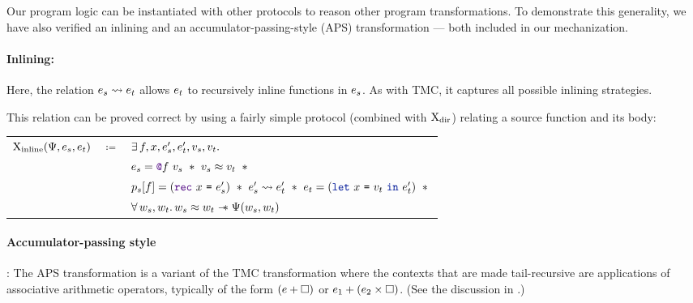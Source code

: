 Our program logic can be instantiated with other protocols to reason other program transformations.
To demonstrate this generality, we have also verified an inlining and an accumulator-passing-style (APS) transformation --- both included in our mechanization.

\paragraph{Inlining:} Here, the relation $\datalangExpr_s \rightsquigarrow \datalangExpr_t$ allows $\datalangExpr_t$ to recursively inline functions in $\datalangExpr_s$.
As with TMC, it captures all possible inlining strategies.

This relation can be proved correct by using a fairly simple protocol (combined with $\mathrm{X}_\mathrm{dir}$) relating a source function and its body:

\begin{tabular}{rcl}
        $\iProt_\mathrm{inline} (\iPredTwo, \datalangExpr_s, \datalangExpr_t)$
        & $\coloneqq$ &
        $\exists \datalangFn, \datalangVar, \datalangExpr_s', \datalangExpr_t', \datalangVal_s, \datalangVal_t \ldotp$
    \\
        &&
        $
        \datalangExpr_s = \datalangCall{\datalangFnptr{\datalangFn}}{\datalangVal_s}
        \ \iSep\ %
        \datalangVal_s \iSimilar \datalangVal_t
        \ \iSep {}$
    \\
        &&
        $\datalangProg_s [\datalangFn] = (\datalangRec{\datalangVar}{\datalangExpr_s'})
        \ \iSep\ %
        \datalangExpr_s' \rightsquigarrow \datalangExpr_t'
        \ \iSep\ %
        \datalangExpr_t = (\datalangLet{\datalangVar}{\datalangVal_t}{\datalangExpr_t'})
        \ \iSep {}$
    \\
        &&
        $\forall \datalangValTwo_s, \datalangValTwo_t \ldotp
        \datalangValTwo_s \iSimilar \datalangValTwo_t \iWand
        \iPredTwo (\datalangValTwo_s, \datalangValTwo_t)$
\end{tabular}
\medskip

\paragraph{Accumulator-passing style}: The APS transformation is a variant of the TMC transformation where the contexts that are made tail-recursive are applications of associative arithmetic operators, typically of the form $(\datalangExpr + \datalangCtxHole)$ or $\datalangExpr_1 + (\datalangExpr_2 \times \datalangCtxHole)$. (See the discussion in \citet*{tmc-koka-2023}.)

